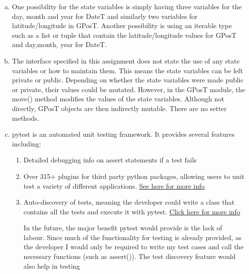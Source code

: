 \documentclass[12pt]{article}
\begin{document}
\begin{enumerate}[(a)]

\item One possibility for the state variables is simply having three variables for the day, month and year for DateT and similarly two variables for latitude/longitude in GPosT. Another possibility is using an iterable type such as a list or tuple that contain the latitude/longitude values for GPosT and day,month, year for DateT.

\item The interface specified in this assignment does not state the use of any state variables or how to maintain them. This means the state variables can be left private or public. Depending on whether the state variables were made public or private, their values could be mutated. However, in the GPosT module, the move() method modifies the values of the state variables. Although not directly, GPosT objects are then indirectly mutable. There are no setter methods. 

\item pytest is an automated unit testing framework. It provides several features including:
\begin{enumerate}[(1)]

\item Detailed debugging info on assert statements if a test fails
\item Over 315+ plugins for third party python packages, allowing users to unit test a variety of different applications. \href{http://plugincompat.herokuapp.com/}{See here for more info}

\item Auto-discovery of tests, meaning the developer could write a class that contains all the tests and execute it with pytest. \href{https://docs.pytest.org/en/latest/goodpractices.html#test-discovery}{Click here for more info}

In the future, the major benefit pytest would provide is the lack of labour. Since much of the functionality for testing is already provided, as the developer I would only be required to write my test cases and call the necessary functions (such as assert()). The test discovery feature would also help in testing

\end{enumerate}


\end{enumerate}
\end{document}
